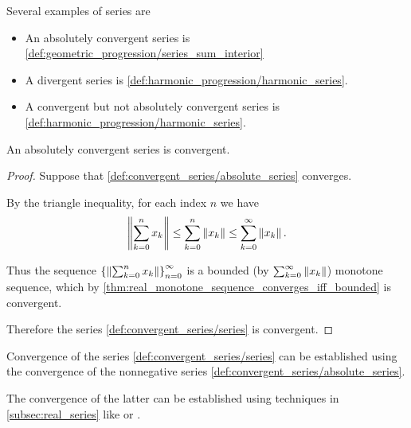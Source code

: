 \begin{example}\label{ex:series}
  Several examples of series are
  \begin{itemize}
    \item An absolutely convergent series is \cref{def:geometric_progression/series_sum_interior}
    \item A divergent series is \cref{def:harmonic_progression/harmonic_series}.
    \item A convergent but not absolutely convergent series is \cref{def:harmonic_progression/harmonic_series}.
  \end{itemize}
\end{example}

\begin{proposition}\label{thm:absolutely_convergent_series_is_convergent}
  An absolutely convergent series is convergent.
\end{proposition}
\begin{proof}
  Suppose that \cref{def:convergent_series/absolute_series} converges.

  By the triangle inequality, for each index \( n \) we have
  \begin{equation*}
    \left\Vert \sum_{k=0}^n x_k \right\Vert \leq \sum_{k=0}^n \left\Vert x_k \right\Vert \leq \sum_{k=0}^\infty \left\Vert x_k \right\Vert.
  \end{equation*}

  Thus the sequence \( \left\{ \left\Vert \sum_{k=0}^{n} x_k \right\Vert \right\}_{n=0}^\infty \) is a bounded (by \( \sum_{k=0}^\infty \left\Vert x_k \right\Vert \)) monotone sequence, which by \cref{thm:real_monotone_sequence_converges_iff_bounded} is convergent.

  Therefore the series \cref{def:convergent_series/series} is convergent.
\end{proof}

\begin{remark}\label{remark:establish_series_convergence_by_absolute_series}
  Convergence of the series \cref{def:convergent_series/series} can be established using the convergence of the nonnegative series \cref{def:convergent_series/absolute_series}.

  The convergence of the latter can be established using techniques in \cref{subsec:real_series} like  or .
\end{remark}

